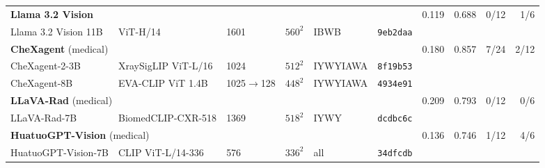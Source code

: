 \begin{table}[h]
\begin{tabular}{llllll@{\hspace{8pt}}rrrr}
\midrule
\multicolumn{6}{l}{\textbf{Llama 3.2 Vision}~\citep{meta2024llama32vision}} & 0.119 & 0.688 & \cellcolor{cfSlate1}0/12 & \cellcolor{cfSlate2}1/6 \\
\quad Llama 3.2 Vision 11B & ViT-H/14 & 1601 & $560^2$ & IBWB & \texttt{9eb2daa} & & & & \\
\midrule
\multicolumn{6}{l}{\textbf{CheXagent} (medical)~\citep{chen2024chexagent}} & 0.180 & 0.857 & \cellcolor{cfSlate3}7/24 & \cellcolor{cfSlate2}2/12 \\
\quad CheXagent-2-3B & XraySigLIP ViT-L/16 & 1024 & $512^2$ & IYWYIAWA & \texttt{8f19b53} & & & & \\
\quad CheXagent-8B & EVA-CLIP ViT 1.4B & 1025$\to$128 & $448^2$ & IYWYIAWA & \texttt{4934e91} & & & & \\
\midrule
\multicolumn{6}{l}{\textbf{LLaVA-Rad} (medical)~\citep{zambranochaves2025llavarad}} & 0.209 & 0.793 & \cellcolor{cfSlate1}0/12 & \cellcolor{cfSlate1}0/6 \\
\quad LLaVA-Rad-7B & BiomedCLIP-CXR-518 & 1369 & $518^2$ & IYWY & \texttt{dcdbc6c} & & & & \\
\midrule
\multicolumn{6}{l}{\textbf{HuatuoGPT-Vision} (medical)~\citep{chen2024huatuogptvision}} & 0.136 & 0.746 & \cellcolor{cfSlate2}1/12 & \cellcolor{cfSlate3}4/6 \\
\quad HuatuoGPT-Vision-7B & CLIP ViT-L/14-336 & 576 & $336^2$ & all & \texttt{34dfcdb} & & & & \\
\bottomrule
\end{tabular}
\end{table}
